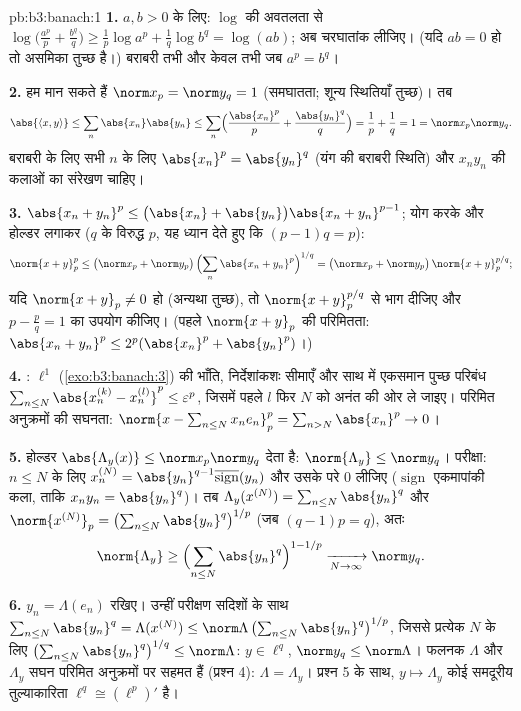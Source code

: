 \begin{solution}{pb:b3:banach:1}
\textbf{1.} $a, b > 0$ के लिए: $\log$ की अवतलता से $\log\bigl(\tfrac{a^p}p + \tfrac{b^q}q\bigr) \geq \tfrac1p\log
a^p + \tfrac1q\log b^q = \log(ab)$; अब चरघातांक
लीजिए। (यदि $ab = 0$ हो तो असमिका तुच्छ है।) बराबरी तभी और केवल तभी
जब $a^p = b^q$।

\textbf{2.} हम मान सकते हैं $\norm x_p = \norm y_q = 1$ (समघातता; शून्य स्थितियाँ तुच्छ)।
तब
\[
\abs{\langle x, y\rangle} \leq \sum_n\abs{x_n}\abs{y_n}
\leq \sum_n\Bigl(\frac{\abs{x_n}^p}p +
\frac{\abs{y_n}^q}q\Bigr) = \frac1p + \frac1q = 1 =
\norm x_p\norm y_q .
\]
बराबरी के लिए सभी $n$ के लिए $\abs{x_n}^p = \abs{y_n}^q$ (यंग की बराबरी स्थिति) और $x_ny_n$
की कलाओं का संरेखण चाहिए।

\textbf{3.} $\abs{x_n + y_n}^p \leq \bigl(\abs{x_n} +
\abs{y_n}\bigr)\abs{x_n + y_n}^{p-1}$; योग करके और होल्डर लगाकर ($q$ के विरुद्ध $p$,
यह ध्यान देते हुए कि $(p - 1)q = p$):
\[
\norm{x + y}_p^p \leq \bigl(\norm x_p + \norm
y_p\bigr)\,\Bigl(\sum_n\abs{x_n + y_n}^{p}\Bigr)^{1/q}
= \bigl(\norm x_p + \norm y_p\bigr)\,\norm{x+y}_p^{p/q};
\]
यदि $\norm{x + y}_p \neq 0$ हो (अन्यथा तुच्छ), तो $\norm{x+y}_p^{p/q}$ से भाग दीजिए और $p - \frac pq = 1$ का उपयोग
कीजिए। (पहले $\norm{x+y}_p$ की परिमितता: $\abs{x_n+y_n}^p \leq
2^p(\abs{x_n}^p + \abs{y_n}^p)$।)

\textbf{4.} : $\ell^1$ (\cref{exo:b3:banach:3}) की भाँति, निर्देशांकशः सीमाएँ
और साथ में एकसमान पुच्छ परिबंध $\sum_{n\leq N}\abs{x^{(k)}_n - x^{(l)}_n}^p
\leq \varepsilon^p$, जिसमें पहले $l$ फिर $N$
को अनंत की ओर ले जाइए। परिमित अनुक्रमों की सघनता: $\norm{x - \sum_{n\leq
N}x_ne_n}_p^p = \sum_{n > N}\abs{x_n}^p \to 0$।

\textbf{5.} होल्डर $\abs{\Lambda_y(x)} \leq \norm
x_p\norm y_q$ देता है: $\norm{\Lambda_y} \leq \norm y_q$। परीक्षा: $n \leq N$ के लिए $x^{(N)}_n = \abs{y_n}^{q-1}\overline{\operatorname{sign}}(y_n)$
और उसके परे $0$ लीजिए ($\operatorname{sign}$ एकमापांकी कला, ताकि $x_ny_n = \abs{y_n}^q$)। तब $\Lambda_y(x^{(N)}) = \sum_{n\leq N}\abs{y_n}^q$
और $\norm{x^{(N)}}_p = \bigl(\sum_{n\leq
N}\abs{y_n}^{q}\bigr)^{1/p}$ (जब $(q-1)p = q$), अतः
\[
\norm{\Lambda_y} \geq \Bigl(\sum_{n\leq
N}\abs{y_n}^q\Bigr)^{1 - 1/p} \xrightarrow[N\to\infty]{}
\norm y_q .
\]

\textbf{6.} $y_n = \Lambda(e_n)$ रखिए। उन्हीं परीक्षण सदिशों के साथ $\sum_{n \leq N}\abs{y_n}^q = \Lambda(x^{(N)}) \leq
\norm\Lambda\,\bigl(\sum_{n\leq N}\abs{y_n}^q\bigr)^{1/p}$, जिससे
प्रत्येक $N$ के लिए $\bigl(\sum_{n\leq N}\abs{y_n}^q\bigr)^{1/q} \leq
\norm\Lambda$: $y \in \ell^q$, $\norm y_q \leq
\norm\Lambda$। फलनक $\Lambda$ और $\Lambda_y$ सघन
परिमित अनुक्रमों पर सहमत हैं (प्रश्न 4): $\Lambda =
\Lambda_y$। प्रश्न 5 के साथ,
$y \mapsto \Lambda_y$ कोई समदूरीय तुल्याकारिता $\ell^q \cong (\ell^p)'$ है।


\end{solution}
